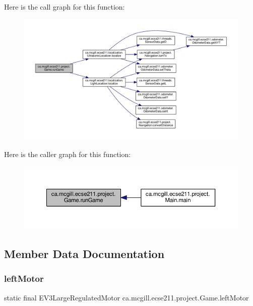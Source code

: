 Here is the call graph for this function\+:
\nopagebreak
\begin{figure}[H]
\begin{center}
\leavevmode
\includegraphics[width=350pt]{enumca_1_1mcgill_1_1ecse211_1_1project_1_1_game_a46cbbf56a4544524174d9d3e63fb9759_cgraph}
\end{center}
\end{figure}
Here is the caller graph for this function\+:
\nopagebreak
\begin{figure}[H]
\begin{center}
\leavevmode
\includegraphics[width=350pt]{enumca_1_1mcgill_1_1ecse211_1_1project_1_1_game_a46cbbf56a4544524174d9d3e63fb9759_icgraph}
\end{center}
\end{figure}


\subsection{Member Data Documentation}
\mbox{\label{enumca_1_1mcgill_1_1ecse211_1_1project_1_1_game_a7c673571bf50fdb6917a9d7bb671e003}} 
\subsubsection{\texorpdfstring{left\+Motor}{leftMotor}}
{\footnotesize\ttfamily  static  final E\+V3\+Large\+Regulated\+Motor ca.\+mcgill.\+ecse211.\+project.\+Game.\+left\+Motor\hspace{0.3cm}{\ttfamily [static]}}

